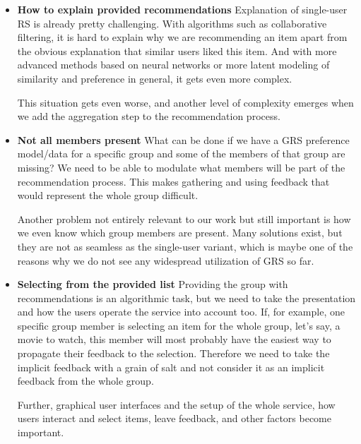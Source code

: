 \begin{itemize}
    \item \textbf{How to explain provided recommendations} \newline
    Explanation of single-user RS is already pretty challenging. With algorithms such as collaborative filtering, it is hard to explain why we are recommending an item apart from the obvious explanation that similar users liked this item. And with more advanced methods based on neural networks or more latent modeling of similarity and preference in general, it gets even more complex.
    
    This situation gets even worse, and another level of complexity emerges when we add the aggregation step to the recommendation process. 
    
    \item \textbf{Not all members present} \newline
    What can be done if we have a GRS preference model/data for a specific group and some of the members of that group are missing? We need to be able to modulate what members will be part of the recommendation process. This makes gathering and using feedback that would represent the whole group difficult.
    
    Another problem not entirely relevant to our work but still important is how we even know which group members are present. Many solutions exist, but they are not as seamless as the single-user variant, which is maybe one of the reasons why we do not see any widespread utilization of GRS so far.
    
    \item \textbf{Selecting from the provided list} \newline
    Providing the group with recommendations is an algorithmic task, but we need to take the presentation and how the users operate the service into account too. If, for example, one specific group member is selecting an item for the whole group, let's say, a movie to watch, this member will most probably have the easiest way to propagate their feedback to the selection. Therefore we need to take the implicit feedback with a grain of salt and not consider it as an implicit feedback from the whole group.
    
    Further, graphical user interfaces and the setup of the whole service, how users interact and select items, leave feedback, and other factors become important.
    
\end{itemize}


